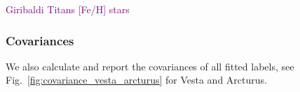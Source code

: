 \documentclass[
  journal=pasa,
  manuscript=research-paper, %
  year=2023,
  volume=37
]{cup-journal}
\newcommand{\SB}[1]{{\textcolor{purple}{#1}}}
\begin{document}
%    

\SB{Giribaldi Titans [Fe/H] stars }

\subsubsection{Covariances} \label{sec:uncertainty_covariance}

We also calculate and report the covariances of all fitted labels, see Fig.~\ref{fig:covariance_vesta_arcturus} for Vesta and Arcturus.
\end{document}
